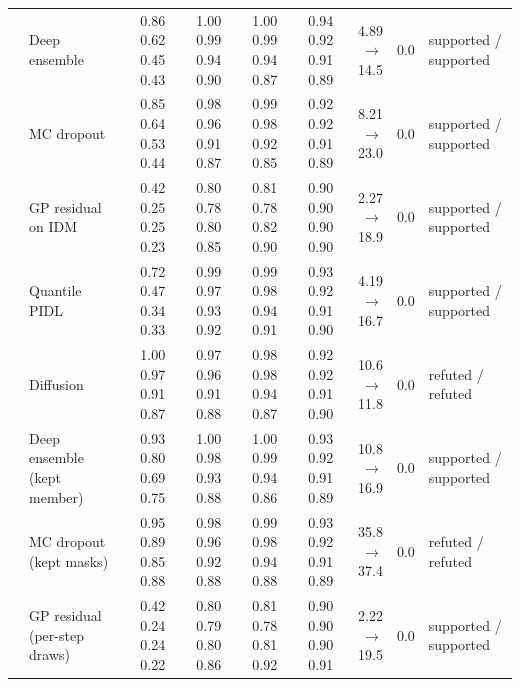 \begin{longtable}{llrrrrrrl}
 & Deep ensemble & 0.86 0.62 0.45 0.43 & 1.00 0.99 0.94 0.90 & 1.00 0.99 0.94 0.87 & 0.94 0.92 0.91 0.89 & 4.89 $\rightarrow$ 14.5 & 0.0 & supported / supported \\
 & MC dropout & 0.85 0.64 0.53 0.44 & 0.98 0.96 0.91 0.87 & 0.99 0.98 0.92 0.85 & 0.92 0.92 0.91 0.89 & 8.21 $\rightarrow$ 23.0 & 0.0 & supported / supported \\
 & GP residual on IDM & 0.42 0.25 0.25 0.23 & 0.80 0.78 0.80 0.85 & 0.81 0.78 0.82 0.90 & 0.90 0.90 0.90 0.90 & 2.27 $\rightarrow$ 18.9 & 0.0 & supported / supported \\
 & Quantile PIDL & 0.72 0.47 0.34 0.33 & 0.99 0.97 0.93 0.92 & 0.99 0.98 0.94 0.91 & 0.93 0.92 0.91 0.90 & 4.19 $\rightarrow$ 16.7 & 0.0 & supported / supported \\
 & Diffusion & 1.00 0.97 0.91 0.87 & 0.97 0.96 0.91 0.88 & 0.98 0.98 0.94 0.87 & 0.92 0.92 0.91 0.90 & 10.6 $\rightarrow$ 11.8 & 0.0 & refuted / refuted \\
 & Deep ensemble (kept member) & 0.93 0.80 0.69 0.75 & 1.00 0.98 0.93 0.88 & 1.00 0.99 0.94 0.86 & 0.93 0.92 0.91 0.89 & 10.8 $\rightarrow$ 16.9 & 0.0 & supported / supported \\
 & MC dropout (kept masks) & 0.95 0.89 0.85 0.88 & 0.98 0.96 0.92 0.88 & 0.99 0.98 0.94 0.88 & 0.93 0.92 0.91 0.89 & 35.8 $\rightarrow$ 37.4 & 0.0 & refuted / refuted \\
 & GP residual (per-step draws) & 0.42 0.24 0.24 0.22 & 0.80 0.79 0.80 0.86 & 0.81 0.78 0.81 0.92 & 0.90 0.90 0.90 0.91 & 2.22 $\rightarrow$ 19.5 & 0.0 & supported / supported \\
\end{longtable}
\endgroup

